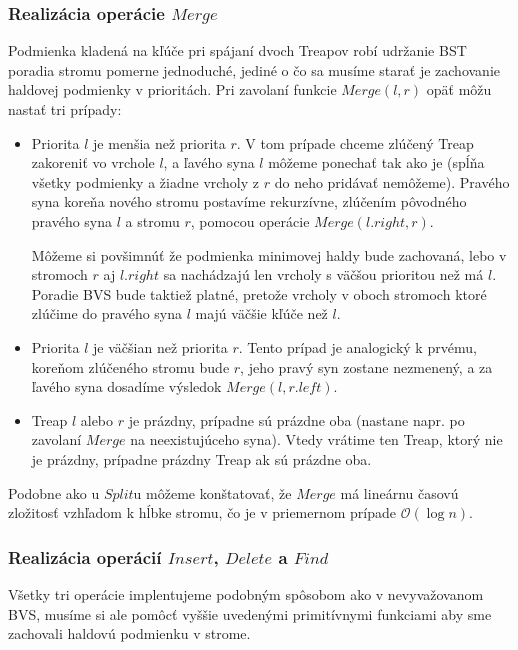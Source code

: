 \documentclass[a4paper, 12pt]{article}
\theoremstyle{definition}
\begin{document}
\subsubsection{Realizácia operácie $Merge$}

Podmienka kladená na kľúče pri spájaní dvoch Treapov robí udržanie BST poradia
stromu pomerne jednoduché, jediné o čo sa musíme starať je zachovanie haldovej
podmienky v prioritách. Pri zavolaní funkcie $Merge(l, r)$ opäť môžu nastať tri
prípady:

\begin{itemize}
    \item Priorita $l$ je menšia než priorita $r$. V tom prípade
        chceme zlúčený Treap zakoreniť vo vrchole $l$, a ľavého syna $l$
        môžeme ponechať tak ako je (spĺňa všetky podmienky a žiadne vrcholy z
        $r$ do neho pridávať nemôžeme). Pravého syna koreňa nového stromu
        postavíme rekurzívne, zlúčením pôvodného pravého syna $l$ a
        stromu $r$, pomocou operácie $Merge(l.right, r)$. 

        Môžeme si povšimnúť že podmienka minimovej haldy bude zachovaná, lebo v
        stromoch $r$ aj $l.right$ sa nachádzajú len vrcholy s väčšou prioritou
        než má $l$. Poradie BVS bude taktiež platné, pretože vrcholy v oboch
        stromoch ktoré zlúčime do pravého syna $l$ majú väčšie kľúče než $l$.

    \item Priorita $l$ je väčšian než priorita $r$. Tento prípad je analogický
        k prvému, koreňom zlúčeného stromu bude $r$, jeho pravý syn zostane
        nezmenený, a za ľavého syna dosadíme výsledok $Merge(l, r.left)$.

    \item Treap $l$ alebo $r$ je prázdny, prípadne sú prázdne oba
        (nastane
        napr. po zavolaní $Merge$ na neexistujúceho syna). Vtedy vrátime ten
        Treap, ktorý nie je prázdny, prípadne prázdny Treap ak sú prázdne oba.
\end{itemize}

Podobne ako u $Split$u môžeme konštatovať, že $Merge$ má lineárnu časovú
zložitosť vzhľadom k hĺbke stromu, čo je v priemernom prípade $\mathcal{O}(\log
n)$.

\subsubsection{Realizácia operácií $Insert$, $Delete$ a $Find$}

Všetky tri operácie implentujeme podobným spôsobom ako v nevyvažovanom BVS,
musíme si ale pomôcť vyššie uvedenými primitívnymi funkciami aby sme zachovali
haldovú podmienku v strome.
\end{document}
